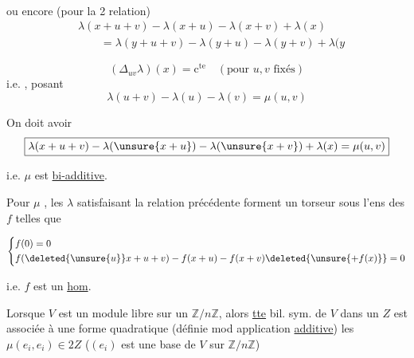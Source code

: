 
ou encore (pour la 2\textsuperscript{} relation)
\[
 \begin{aligned}
 &\lambda(x+u+v)-\lambda(x+u)-\lambda(x+v)+\lambda(x)\\
 &\qquad=\lambda(y+u+v)-\lambda(y+u)-\lambda(y+v)+\lambda(y
 \end{aligned}
\]

\[
 (\Delta_{uv}\lambda)(x)=\mathrm{c}^{\mathrm{te}}\quad(\text{pour }u,v\text{ fixés})
\]
i.e. , posant
\[
 \lambda(u+v)-\lambda(u)-\lambda(v)=\mu(u,v)
\]

On doit avoir
\[
 \boxed{\lambda(x+u+v)-\lambda(\unsure{x+u})-\lambda(\unsure{x+v})+\lambda(x)=\mu(u,v)}
\]

i.e. $\mu$ est \uline{bi-additive}.


Pour $\mu$  , les $\lambda$ satisfaisant la relation précédente  forment un torseur sous l'ens des $f$ telles que

\[
 \left\{\begin{aligned}
 &f(0)=0\\
 &f(\deleted{\unsure{u}}x+u+v)-f(x+u)-f(x+v)\deleted{\unsure{+f(x)}}=0
 \end{aligned}\right.
\]



 i.e. $f$ est un  \uline{hom}.

 Lorsque $V$ est un module libre sur un $\mathbb Z/n\mathbb Z$, alors \uline{tte} \uline{} bil. sym. de $V$ dans un $Z$ est associée à une forme quadratique (définie mod application \uline{additive})  les $\mu(e_i,e_i)\in2Z$ ($(e_i)$ est une base de $V$ sur $\mathbb Z/n\mathbb Z$) 

